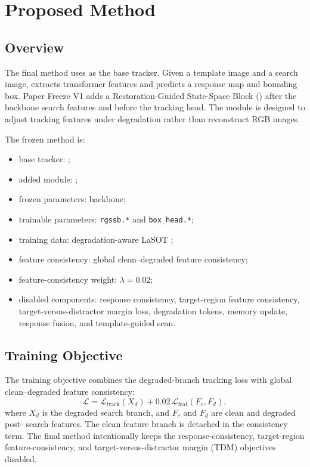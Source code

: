 \section{Proposed Method}

\subsection{Overview}
The final method uses \baseline{} as the base tracker. Given a template image and a search image, \baseline{} extracts transformer features and predicts a response map and bounding box. Paper Freeze V1 adds a Restoration-Guided State-Space Block (\method{}) after the backbone search features and before the tracking head. The module is designed to adjust tracking features under degradation rather than reconstruct RGB images.

The frozen method is:
\begin{itemize}
    \item base tracker: \baseline{};
    \item added module: \method{};
    \item frozen parameters: backbone;
    \item trainable parameters: \texttt{rgssb.*} and \texttt{box\_head.*};
    \item training data: degradation-aware LaSOT ;
    \item feature consistency: global clean--degraded feature consistency;
    \item feature-consistency weight: $\lambda=0.02$;
    \item disabled components: response consistency, target-region feature consistency, target-versus-distractor margin loss, degradation tokens, memory update, response fusion, and template-guided scan.
\end{itemize}

\subsection{Training Objective}
The training objective combines the degraded-branch tracking loss with global clean--degraded feature consistency:
\begin{equation}
    \mathcal{L} = \mathcal{L}_{\mathrm{track}}(X_d) + 0.02\,\mathcal{L}_{\mathrm{feat}}(F_c, F_d),
\end{equation}
where $X_d$ is the degraded search branch, and $F_c$ and $F_d$ are clean and degraded post-\method{} search features. The clean feature branch is detached in the consistency term. The final method intentionally keeps the response-consistency, target-region feature-consistency, and target-versus-distractor margin (TDM) objectives disabled.
